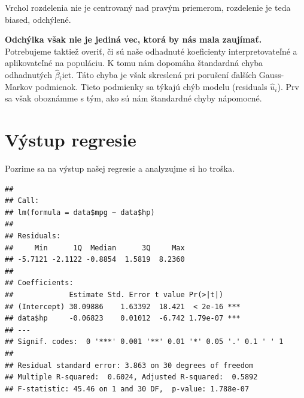 Vrchol rozdelenia nie je centrovaný nad pravým priemerom, rozdelenie je
teda biased, odchýlené.

\textbf{Odchýlka však nie je jediná vec, ktorá by nás mala zaujímať.}
Potrebujeme taktiež overiť, či sú naše odhadnuté koeficienty
interpretovateľné a aplikovateľné na populáciu. K tomu nám dopomáha
štandardná chyba odhadnutých \(\hat\beta{}_i\)iet. Táto chyba je však
skreslená pri porušení ďalších Gauss-Markov podmienok. Tieto podmienky
sa týkajú chýb modelu (residuals \(\hat u_i\)). Prv sa však oboznámme s
tým, ako sú nám štandardné chyby nápomocné.

\newpage

\hypertarget{vuxfdstup-regresie}{%
\section{Výstup regresie}\label{vuxfdstup-regresie}}

Pozrime sa na výstup našej regresie a analyzujme si ho troška.

\begin{Shaded}
\begin{Highlighting}[]

\end{Highlighting}
\end{Shaded}

\begin{verbatim}
## 
## Call:
## lm(formula = data$mpg ~ data$hp)
## 
## Residuals:
##     Min      1Q  Median      3Q     Max 
## -5.7121 -2.1122 -0.8854  1.5819  8.2360 
## 
## Coefficients:
##             Estimate Std. Error t value Pr(>|t|)    
## (Intercept) 30.09886    1.63392  18.421  < 2e-16 ***
## data$hp     -0.06823    0.01012  -6.742 1.79e-07 ***
## ---
## Signif. codes:  0 '***' 0.001 '**' 0.01 '*' 0.05 '.' 0.1 ' ' 1
## 
## Residual standard error: 3.863 on 30 degrees of freedom
## Multiple R-squared:  0.6024, Adjusted R-squared:  0.5892 
## F-statistic: 45.46 on 1 and 30 DF,  p-value: 1.788e-07
\end{verbatim}

\begin{Shaded}
\begin{Highlighting}[]

\OperatorTok{$}
\end{Highlighting}
\end{Shaded}

